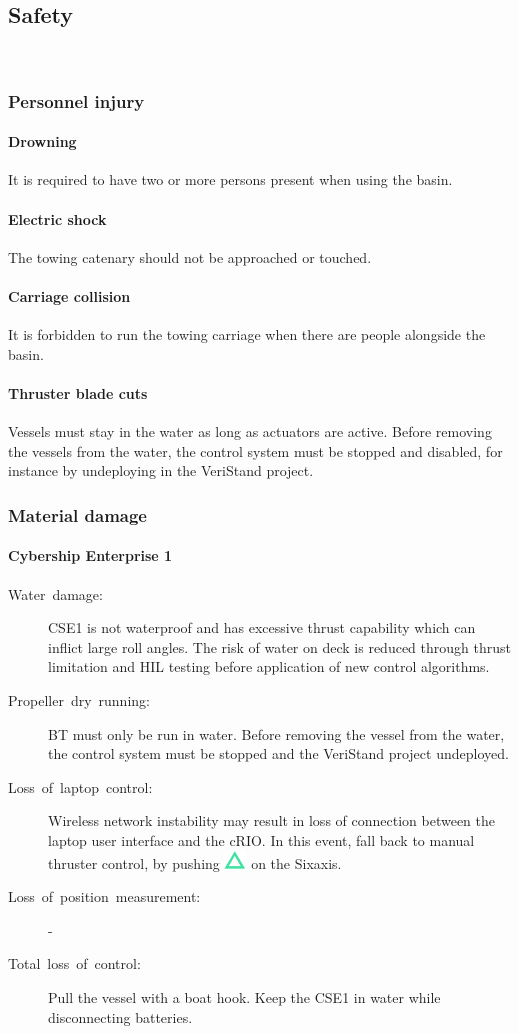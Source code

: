 \documentclass[a4paper,english]{report}
\begin{document}
\subsection{Safety}\
\subsubsection{Personnel injury}
\paragraph{Drowning}
It is required to have two or more persons present when using the basin.
\paragraph{Electric shock}
The towing catenary should not be approached or touched.
\paragraph{Carriage collision}
It is forbidden to run the towing carriage when there are people alongside the basin.
\paragraph{Thruster blade cuts}
Vessels must stay in the water as long as actuators are active. Before removing the vessels from the water, the control system must be stopped and disabled, for instance by undeploying in the VeriStand project.

\subsubsection{Material damage}
\paragraph{Cybership Enterprise 1}
\begin{description}
	\item [{Water~damage:}] CSE1 is not waterproof and has excessive thrust capability which can inflict large roll angles. The risk of water on deck is reduced through thrust limitation and HIL testing before application of new control algorithms. 
	\item [{Propeller~dry~running:}] BT must only be run in water. Before removing the vessel from the water, the control system must be stopped and the VeriStand project undeployed.
	\item [{Loss~of~laptop~control:}] Wireless network instability may result in loss of connection between the laptop user interface and the cRIO. In this event, fall back to manual thruster control, by pushing \includegraphics[scale=0.4]{fig/sixaxis_triangle} on the Sixaxis.
	\item [{Loss~of~position~measurement:}] -
	\item [{Total~loss~of~control:}] Pull the vessel with a boat hook. Keep the CSE1 in water while disconnecting batteries.
\end{description}
\end{document}
